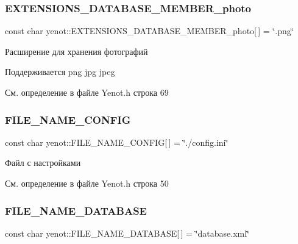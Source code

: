 \subsubsection{\texorpdfstring{E\+X\+T\+E\+N\+S\+I\+O\+N\+S\+\_\+\+D\+A\+T\+A\+B\+A\+S\+E\+\_\+\+M\+E\+M\+B\+E\+R\+\_\+photo}{EXTENSIONS\_DATABASE\_MEMBER\_photo}}
{\footnotesize\ttfamily const char yenot\+::\+E\+X\+T\+E\+N\+S\+I\+O\+N\+S\+\_\+\+D\+A\+T\+A\+B\+A\+S\+E\+\_\+\+M\+E\+M\+B\+E\+R\+\_\+photo\mbox{[}$\,$\mbox{]} = \char`\"{}.png\char`\"{}}

Расширение для хранения фотографий

Поддерживается png jpg jpeg 

См. определение в файле Yenot.\+h строка 69

\mbox{\label{namespaceyenot_a376e7adfbabcae01c8305ed17d47d576}} 
\subsubsection{\texorpdfstring{F\+I\+L\+E\+\_\+\+N\+A\+M\+E\+\_\+\+C\+O\+N\+F\+IG}{FILE\_NAME\_CONFIG}}
{\footnotesize\ttfamily const char yenot\+::\+F\+I\+L\+E\+\_\+\+N\+A\+M\+E\+\_\+\+C\+O\+N\+F\+IG\mbox{[}$\,$\mbox{]} = \char`\"{}./config.\+ini\char`\"{}}



Файл с настройками 



См. определение в файле Yenot.\+h строка 50

\mbox{\label{namespaceyenot_ae254e34a07790b92c8085e559be10f38}} 
\subsubsection{\texorpdfstring{F\+I\+L\+E\+\_\+\+N\+A\+M\+E\+\_\+\+D\+A\+T\+A\+B\+A\+SE}{FILE\_NAME\_DATABASE}}
{\footnotesize\ttfamily const char yenot\+::\+F\+I\+L\+E\+\_\+\+N\+A\+M\+E\+\_\+\+D\+A\+T\+A\+B\+A\+SE\mbox{[}$\,$\mbox{]} = \char`\"{}database.\+xml\char`\"{}}



